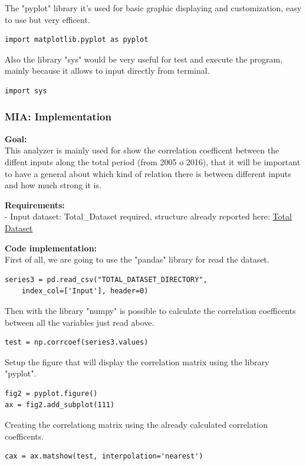 The "pyplot" library it's used for basic graphic displaying and customization, easy to use but very efficent.
\begin{lstlisting}
import matplotlib.pyplot as pyplot
\end{lstlisting}

Also the library "sys" would be very useful for test and execute the program, mainly because it allows to input directly from terminal.
\begin{lstlisting}
import sys
\end{lstlisting}

\newpage
\subsubsection{MIA: Implementation}
\textbf{Goal:}\\
This analyzer is mainly used for show the correlation coefficent between the diffent inputs along the total period (from 2005 o 2016), that it will be important to have a general about which kind of relation there is between different inputs and how much strong it is.

\textbf{Requirements:}\\
- Input dataset: Total\_Dataset required, structure already reported here:
\hyperref[table: Total_Dataset]{Total Dataset}

\textbf{Code implementation:}\\
First of all, we are going to use the "pandas" library for read the dataset.
\begin{lstlisting}
series3 = pd.read_csv("TOTAL_DATASET_DIRECTORY", 
	index_col=['Input'], header=0)
\end{lstlisting}

Then with the library "numpy" is possible to calculate the correlation coefficents between all the variables just read above.
\begin{lstlisting}
test = np.corrcoef(series3.values)
\end{lstlisting}

Setup the figure that will display the correlation matrix using the library "pyplot".
\begin{lstlisting}
fig2 = pyplot.figure()
ax = fig2.add_subplot(111)
\end{lstlisting}

Creating the correlationg matrix using the already calculated correlation coefficents.
\begin{lstlisting}
cax = ax.matshow(test, interpolation='nearest')
\end{lstlisting}

